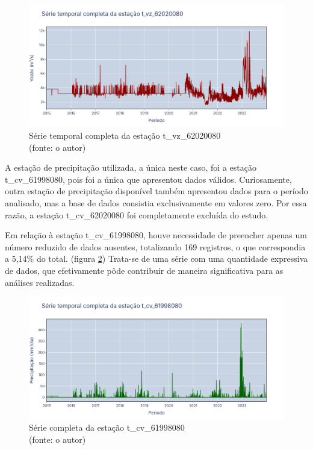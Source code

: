 \begin{figure}[!h]
	\centering
	\includegraphics[scale=0.25]{Figuras/rio_grande/grandeSerieCompleta_t_vz_62020080.png}
	\caption{Série temporal completa da estação t\_vz\_62020080\\(fonte: o autor)}
	\label{fig:grandeSerieCompleta_t_vz_62020080}
\end{figure}

A estação de precipitação utilizada, a única neste caso, foi a estação t\_cv\_61998080, pois foi a única que apresentou dados válidos. Curiosamente, outra estação de precipitação disponível também apresentou dados para o período analisado, mas a base de dados consistia exclusivamente em valores zero. Por essa razão, a estação t\_cv\_62020080 foi completamente excluída do estudo.

Em relação à estação t\_cv\_61998080, houve necessidade de preencher apenas um número reduzido de dados ausentes, totalizando 169 registros, o que correspondia a 5,14\% do total. (figura \ref{fig:grandeSerieCompleta_t_cv_61998080}) Trata-se de uma série com uma quantidade expressiva de dados, que efetivamente pôde contribuir de maneira significativa para as análises realizadas.

\begin{figure}[!h]
	\centering
	\includegraphics[scale=0.25]{Figuras/rio_grande/grandeSerieCompleta_t_cv_61998080.png}
	\caption{Série completa da estação t\_cv\_61998080\\(fonte: o autor)}
	\label{fig:grandeSerieCompleta_t_cv_61998080}
\end{figure}

